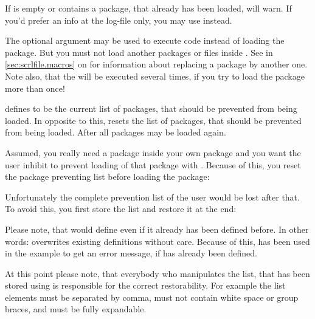 If  is empty or contains a package, that already has been
loaded,  will warn. If you'd prefer an
info at the log-file only, you may use
 instead.

The optional argument may be used to
execute code instead of loading the package. But you must not load another
packages or files inside . See  in
\autoref{sec:scrlfile.macros} on
 for information about replacing
a package by another one. Note also, that the  will be
executed several times, if you try to load the package more than once!%
\EndIndexGroup


\begin{Declaration}
\end{Declaration}
defines  to be the current list of packages, that should be
prevented from being loaded. In opposite to this,
resets the list of packages, that should be prevented from being loaded. After
 all packages may be loaded again.
\begin{Example}
  Assumed, you really need a package inside your own package and you want the
  user inhibit to prevent loading of that package with
  . Because
  of this, you reset the package preventing list before loading the package:
\begin{lstcode}
  \ResetPreventPackageFromLoading
  \RequirePackage{foo}
\end{lstcode}
  Unfortunately the complete prevention list of the user would be lost after
  that. To avoid this, you first store the list and restore it at the end:
\begin{lstcode}
  \newcommand*{\Users@PreventList}{}%
  \StorePreventPackageFromLoading\Users@PreventList
  \ResetPreventPackageFromLoading
  \RequirePackage{foo}
  \PreventPackageFromLoading{\Users@PreventList}
\end{lstcode}
  Please note, that
   would define
   even if it already has been defined before. In other
  words:  overwrites existing
   definitions without care. Because of this,
   has been used in the example to get an error message, if
   has already been defined.
\end{Example}
At this point please note, that everybody who manipulates the list, that has
been stored using  is responsible for
the correct restorability. For example the list elements must be separated by
comma, must not contain white space or group braces, and must be fully
expandable.

